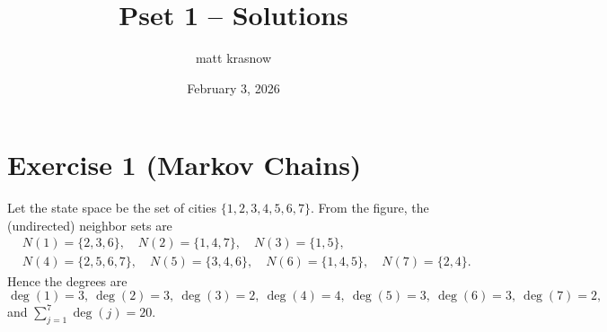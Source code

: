 \documentclass[11pt]{article}
\title{Pset 1 -- Solutions}
\author{matt krasnow}
\date{February 3, 2026}
\begin{document}
\maketitle

\section*{Exercise 1 (Markov Chains)}

Let the state space be the set of cities $\{1,2,3,4,5,6,7\}$. From the figure, the (undirected) neighbor sets are
\[
\begin{aligned}
&N(1)=\{2,3,6\},\quad N(2)=\{1,4,7\},\quad N(3)=\{1,5\},\\
&N(4)=\{2,5,6,7\},\quad N(5)=\{3,4,6\},\quad N(6)=\{1,4,5\},\quad N(7)=\{2,4\}.
\end{aligned}
\]
Hence the degrees are
\[
\deg(1)=3,\ \deg(2)=3,\ \deg(3)=2,\ \deg(4)=4,\ \deg(5)=3,\ \deg(6)=3,\ \deg(7)=2,
\]
and $\sum_{j=1}^7 \deg(j)=20$.
\end{document}
